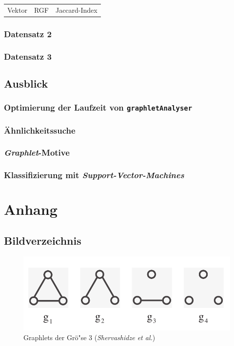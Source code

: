 \documentclass{report}
\begin{document}
\begin{table}
\begin{tabular}{c c c}

Vektor & RGF & Jaccard-Index \\

\end{tabular}
\end{table}


\subsection{Datensatz 2}

\subsection{Datensatz 3}

\section{Ausblick}


\subsection{Optimierung der Laufzeit von \texttt{graphletAnalyser}}

\subsection{\"Ahnlichkeitssuche}

\subsection{\textit{Graphlet}-Motive}

\subsection{Klassifizierung mit \textit{Support-Vector-Machines}}


\chapter{Anhang}


\section{Bildverzeichnis}

\begin{figure}[h!]
\includegraphics[width =\linewidth]{3graphlets.pdf}
\caption{Graphlets der Gr\"o"se 3 (\textit{Shervashidze et al.})}
\label{fig:3graphlets}
\end{figure}
\end{document}
